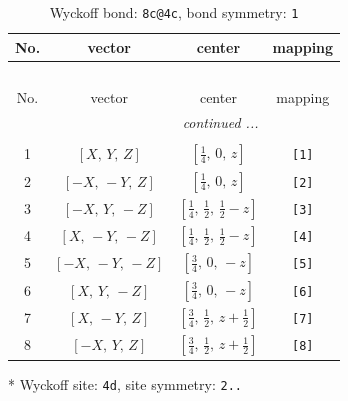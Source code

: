 \documentclass[fleqn,8pt]{jsarticle}
\begin{document}
\begin{longtable}{cccc}
\caption{Wyckoff bond: {\tt 8c@4c}, bond symmetry: {\tt 1}}
 \\
 \hline \hline
No. & vector & center & mapping \\ \hline \endfirsthead

\multicolumn{3}{l}{\tablename\ \thetable{}} \\
 \hline \hline
No. & vector & center & mapping \\ \hline \endhead

 \hline \hline
\multicolumn{3}{r}{\footnotesize\it continued ...} \\ \endfoot

 \hline \hline
\multicolumn{3}{r}{} \\ \endlastfoot

1 & $\left[ X,\, Y,\, Z \right]$ & $\left[ \frac{1}{4},\, 0,\, z \right]$ & {\tt [1]} \\ \hline
2 & $\left[ - X,\, - Y,\, Z \right]$ & $\left[ \frac{1}{4},\, 0,\, z \right]$ & {\tt [2]} \\ \hline
3 & $\left[ - X,\, Y,\, - Z \right]$ & $\left[ \frac{1}{4},\, \frac{1}{2},\, \frac{1}{2} - z \right]$ & {\tt [3]} \\ \hline
4 & $\left[ X,\, - Y,\, - Z \right]$ & $\left[ \frac{1}{4},\, \frac{1}{2},\, \frac{1}{2} - z \right]$ & {\tt [4]} \\ \hline
5 & $\left[ - X,\, - Y,\, - Z \right]$ & $\left[ \frac{3}{4},\, 0,\, - z \right]$ & {\tt [5]} \\ \hline
6 & $\left[ X,\, Y,\, - Z \right]$ & $\left[ \frac{3}{4},\, 0,\, - z \right]$ & {\tt [6]} \\ \hline
7 & $\left[ X,\, - Y,\, Z \right]$ & $\left[ \frac{3}{4},\, \frac{1}{2},\, z + \frac{1}{2} \right]$ & {\tt [7]} \\ \hline
8 & $\left[ - X,\, Y,\, Z \right]$ & $\left[ \frac{3}{4},\, \frac{1}{2},\, z + \frac{1}{2} \right]$ & {\tt [8]} \\
\end{longtable}
* Wyckoff site: {\tt 4d}, site symmetry: {\tt 2..}
\renewcommand{\arraystretch}{1.2}
\end{document}
